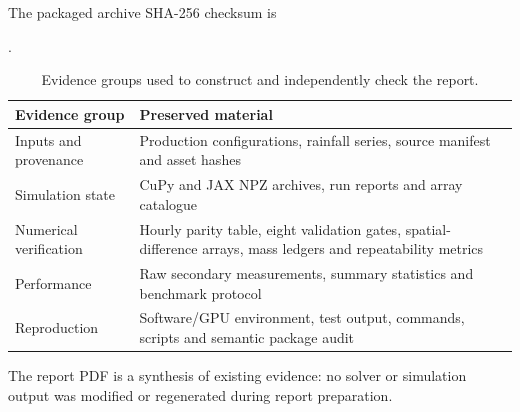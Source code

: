 \documentclass[11pt,a4paper,oneside]{report}
\begin{document}
The packaged archive SHA-256 checksum is
\begin{center}\small
{}.
\end{center}

\begin{table}[H]
\centering
\caption[Evidence retained with the completed project.]{Evidence groups used to construct
and independently check the report.}
\label{tab:evidencefiles}
\footnotesize
\begin{tabularx}{\textwidth}{|p{}|X|}
\hline
\textbf{Evidence group} & \textbf{Preserved material} \\
\hline\hline
Inputs and provenance & Production configurations, rainfall series, source manifest and
asset hashes \\ \hdashline[0.4pt/1.2pt]
Simulation state & CuPy and JAX NPZ archives, run reports and array catalogue \\
\hdashline[0.4pt/1.2pt]
Numerical verification & Hourly parity table, eight validation gates, spatial-difference
arrays, mass ledgers and repeatability metrics \\ \hdashline[0.4pt/1.2pt]
Performance & Raw secondary measurements, summary statistics and benchmark protocol \\
\hdashline[0.4pt/1.2pt]
Reproduction & Software/GPU environment, test output, commands, scripts and semantic package
audit \\
\hline
\end{tabularx}
\end{table}
The report PDF is a synthesis of existing evidence: no solver or simulation output was
modified or regenerated during report preparation.
\end{document}

